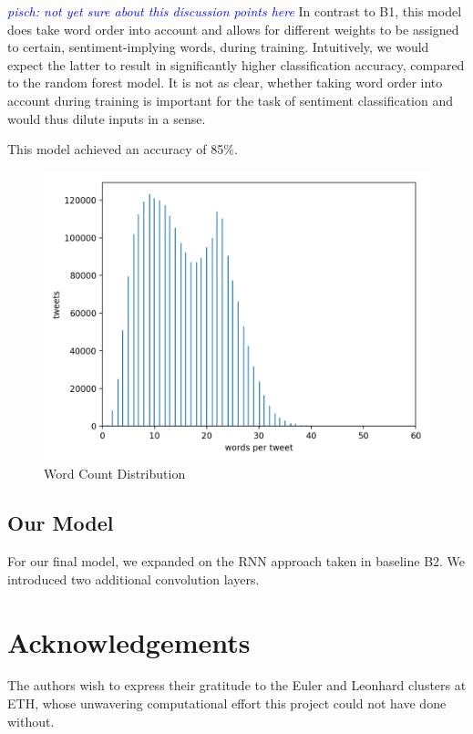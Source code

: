 \documentclass[10pt,conference,compsocconf]{IEEEtran}
\newcommand{\pisch}[1]{\textit{\textcolor{blue}{pisch: #1}}}
\begin{document}
\pisch{not yet sure about this discussion points here}
In contrast to B1, this model does take word order into account
and allows for different weights to be assigned to certain,
sentiment-implying words, during training. Intuitively, we would
expect the latter to result in significantly higher classification
accuracy, compared to the random forest model. It is not as clear,
whether taking word order into account during training is important
for the task of sentiment classification and would thus dilute inputs
in a sense.

This model achieved an accuracy of 85\%.

\begin{figure}[h!]
  \centering
  \includegraphics[scale=0.53]{word_count_histogram.png}
  \caption{Word Count Distribution}
  \label{fig:wordcount}
\end{figure}


\subsection{Our Model}

For our final model, we expanded on the RNN approach taken in baseline
B2. We introduced two additional convolution layers.

\section*{Acknowledgements}
The authors wish to express their gratitude to the Euler and Leonhard
clusters at ETH, whose unwavering computational effort this project
could not have done without.



\end{document}
